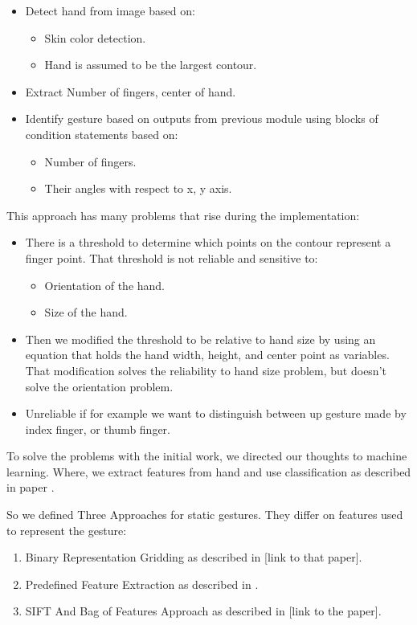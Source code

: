 \begin{itemize}
\item Detect hand from image based on:
\begin{itemize}
\item Skin color detection.
\item Hand is assumed to be the largest contour.
\end{itemize}
\item Extract Number of fingers, center of hand.
\item Identify gesture based on outputs from previous module using blocks of condition statements based on:
\begin{itemize}
\item Number of fingers.
\item Their angles with respect to x, y axis.
\end{itemize}
\end{itemize}
\bigskip

This approach has many problems that rise during the implementation:\bigskip


\begin{itemize}
\item There is a threshold to determine which points on the contour represent a finger point. That threshold is not reliable and sensitive to:
\begin{itemize}
\item Orientation of the hand.
\item Size of the hand.
\end{itemize}
\item Then we modified the threshold to be relative to hand size by using an equation that holds the hand width, height, and center point as variables.
That modification solves the reliability to hand size problem, but doesn't solve the orientation problem.
\item Unreliable if for example we want to distinguish between up gesture made by index finger, or thumb finger.
\end{itemize}
\bigskip

To solve the problems with the initial work, we directed our thoughts to machine learning. Where, we extract features from hand and use classification as described in paper \cite{relatedsg6}.
\bigskip

So we defined Three Approaches for static gestures. They differ on features used to represent the gesture:
\begin{enumerate}
\item Binary Representation Gridding as described in [link to that paper].
\item Predefined Feature Extraction as described in \cite{paper2sT}.
\item SIFT And Bag of Features Approach as described in [link to the paper].
\end{enumerate}
\bigskip


